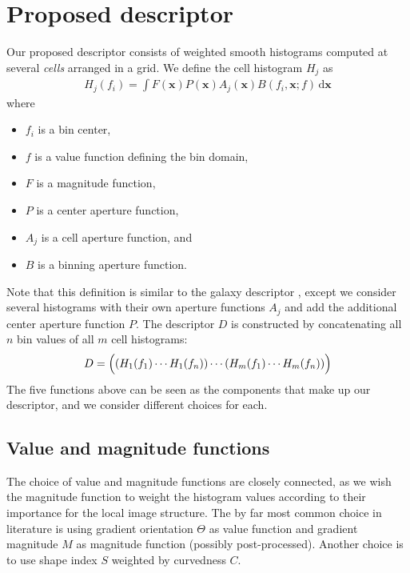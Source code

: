 \documentclass[thesis.tex]{subfiles}
\def\x{\mathbf{x}}
\begin{document}
\chapter{Proposed descriptor}
%
Our proposed descriptor consists of weighted smooth histograms computed at several \textit{cells} arranged in a grid. We define the cell histogram $H_j$ as
%
\begin{align}
H_j(f_i) = \int F(\x) P (\x) A_j (\x) B(f_i, \x; f) \,\text{d} \x
\end{align}
%
where
%
\begin{itemize}
\item[] $f_i$ is a bin center,
\item[] $f$ is a value function defining the bin domain,
\item[] $F$ is a magnitude function,
\item[] $P$ is a center aperture function,
\item[] $A_j$ is a cell aperture function, and
\item[] $B$ is a binning aperture function.
\end{itemize}
%
Note that this definition is similar to the galaxy descriptor \cite{pedersen2013shape}, except we consider several histograms with their own aperture functions $A_j$ and add the additional center aperture function $P$. The descriptor $D$ is constructed by concatenating all $n$ bin values of all $m$ cell histograms:
%
\begin{align}
D = \Bigl( \left(H_1(f_1) \cdots H_1(f_n)\right) \cdots (H_m(f_1) \cdots H_m(f_n)) \Bigr)
\end{align}
%
The five functions above can be seen as the components that make up our descriptor, and we consider different choices for each.
%
\section{Value and magnitude functions}
%
The choice of value and magnitude functions are closely connected, as we wish the magnitude function to weight the histogram values according to their importance for the local image structure. The by far most common choice in literature \cite{lowe2004distinctive,ke2004pca,mikolajczyk2005performance,tola2008fast} is using gradient orientation $\Theta$ as value function and gradient magnitude $M$ as magnitude function (possibly post-processed). Another choice \cite{pedersen2013shape} is to use shape index $S$ weighted by curvedness $C$.
\end{document}
